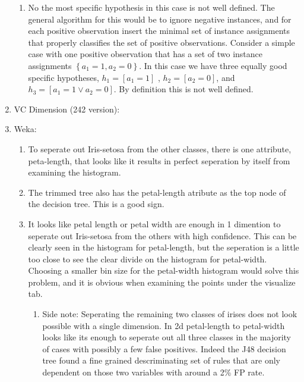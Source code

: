 \documentclass[12pt]{article}
\begin{document}
\begin{enumerate}
\begin{enumerate}
\item No the most specific hypothesis in this case is not well defined.
The general algorithm for this would be to ignore negative instances,
and for each positive observation insert the minimal set of instance
assignments that properly classifies the set of positive observations.
Consider a simple case with one positive observation that has a set
of two instance assignments $\left\{ a_{1}=1,a_{2}=0\right\} $. In
this case we have three equally good specific hypotheses, $h_{1}=\left[a_{1}=1\right]$
, $h_{2}=\left[a_{2}=0\right]$, and $h_{3}=\left[a_{1}=1\vee a_{2}=0\right]$.
By definition this is not well defined.
\end{enumerate}
\item VC Dimension (242 version): 
\item Weka:

\begin{enumerate}
\item To seperate out Iris-setosa from the other classes, there is one attribute,
peta-length, that looks like it results in perfect seperation by itself
from examining the histogram.
\item The trimmed tree also has the petal-length atribute as the top node
of the decision tree. This is a good sign.
\item It looks like petal length or petal width are enough in 1 dimention
to seperate out Iris-setosa from the others with high confidence.
This can be clearly seen in the histogram for petal-length, but the
seperation is a little too close to see the clear divide on the histogram
for petal-width. Choosing a smaller bin size for the petal-width histogram
would solve this problem, and it is obvious when examining the points
under the visualize tab.

\begin{enumerate}
\item Side note: Seperating the remaining two classes of irises does not
look possible with a single dimension. In 2d petal-length to petal-width
looks like its enough to seperate out all three classes in the majority
of cases with possibly a few false positives. Indeed the J48 decision
tree found a fine grained descriminating set of rules that are only
dependent on those two variables with around a 2\% FP rate.\end{enumerate}
\end{enumerate}
\end{enumerate}
\end{document}
